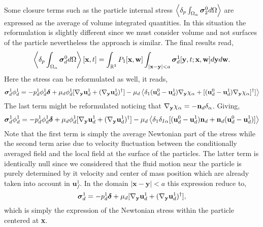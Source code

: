 Some closure terms such as the particle internal stress $\left<\delta_p \int_{\Omega_{\alpha}} \bm{\sigma}_2^0 d\Omega\right>$ are expressed as the average of volume integrated quantities. 
In this situation the reformulation is slightly different since we must consider volume and not surfaces of the particle nevertheless the approach is similar. 
The final results read, 
\begin{equation}
    \pOavg{\bm\sigma_d^0}[\textbf{x},t]
    =
    \int_{\mathbb{R}^3}
    P_1[\textbf{x},\textbf{w}]
    \int_{|\textbf{x}-\textbf{y}|<a}
    \bm\sigma_d^1[\textbf{y},t;\textbf{x},\textbf{w}] 
    d\textbf{y}
    d\textbf{w}. 
    \label{eq:conditionally_averaged_vol}
\end{equation}
Here the stress can be reformulated as well, it reads, 
\begin{equation*}
    \bm\sigma_d^1\phi_d^1  
    = 
    -p_d^1 \phi_d^1  \bm\delta
    + \mu_d 
    \phi_d^1 
     [{\mathbf{\nabla}_\textbf{y}} \textbf{u}^1_d+({\mathbf{\nabla}_\textbf{y}}  \textbf{u}^1_d)^\dagger]
     - \mu_d
     \left<
         \delta_1
         (\textbf{u}_d^0 - \textbf{u}_d^1)
         {\mathbf{\nabla}_\textbf{y}}  \chi_{\alpha}
         + 
         [(\textbf{u}_d^0 - \textbf{u}_d^1)
            {\mathbf{\nabla}_\textbf{y}}  \chi_{\alpha}]^\dagger
         ]
         \right>
\end{equation*}
The last term might be reformulated noticing that ${\mathbf{\nabla}_\textbf{y}}  \chi_\alpha = - \textbf{n}_d \delta_{\alpha}$. 
Giving, 
\begin{equation*}
    \bm\sigma_d^1\phi_d^1  
    = 
    -p_d^1 \phi_d^1  \bm\delta
    + \mu_d \phi_d^1 [{\mathbf{\nabla}_\textbf{y}} \textbf{u}^1_d+({\mathbf{\nabla}_\textbf{y}}  \textbf{u}^1_d)^\dagger]
     - \mu_d
     \left<
         \delta_1
         \delta_{I\alpha}
         [(\textbf{u}_d^0 - \textbf{u}_d^1) \textbf{n}_d 
         + \textbf{n}_d (\textbf{u}_d^0 - \textbf{u}_d^1)]
         \right>
\end{equation*}
Note that the first term is simply the average Newtonian part of the stress while the second term arise due to velocity fluctuation between the conditionally averaged field and the local field at the surface of the particles. 
The latter term is identically null since we considered that the fluid motion near the particle is purely determined by it velocity and center of mass position which are already taken into account in $\textbf{u}_f^1$. 
In the domain $|\textbf{x} - \textbf{y}| < a$ this expression reduce to, 
\begin{equation*}
    \bm\sigma_d^1  
    = 
    -p_d^1   \bm\delta
    + \mu_d  [{\mathbf{\nabla}_\textbf{y}} \textbf{u}^1_d+({\mathbf{\nabla}_\textbf{y}}  \textbf{u}^1_d)^\dagger],
\end{equation*}
which is simply the expression of the Newtonian stress within the particle centered at \textbf{x}. 

